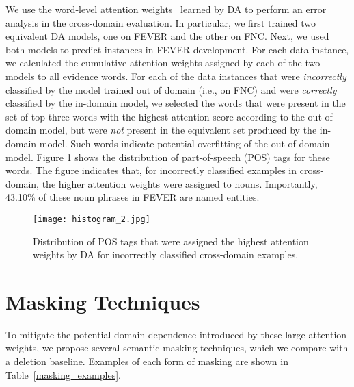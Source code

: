 \documentclass[11pt,a4paper]{article}
\begin{document}
We use the word-level attention weights~\cite{bahdanau2014neural} learned by DA to perform  an error analysis in the cross-domain evaluation. 
In particular, we first trained two equivalent DA models, one on FEVER and the other on FNC. 
Next, we used both models to predict instances in FEVER development. For each data instance, we calculated the cumulative attention weights assigned by each of the two models to all evidence words. 
For each of the data instances that were {\em incorrectly} classified by the model trained out of domain (i.e., on FNC) and were {\em correctly} classified by the in-domain model, 
we  selected the words that were present in the set of top three words with the highest attention score according to the out-of-domain model, but were {\em not} present in the equivalent set produced by the in-domain model. Such words indicate potential overfitting of the out-of-domain model. 
Figure \ref{fig:attention} shows the distribution of part-of-speech (POS) tags for these words. The figure indicates that, for incorrectly classified examples in cross-domain, the higher attention weights were assigned to nouns.
Importantly, 43.10\% of these noun phrases in FEVER are named entities. 



\begin{figure}
 \texttt{[image: histogram\_2.jpg]}
    \vspace{-3mm}
    \caption{ Distribution of POS tags that were assigned the highest attention weights by DA for incorrectly classified cross-domain examples.}
  \label{fig:attention}
\vspace{-6mm}
\end{figure}



\section{Masking Techniques}\label{masking_techniques}

To mitigate the potential domain dependence introduced by these large attention weights, we propose several semantic masking techniques, which we compare with a deletion baseline.  Examples of each form of masking are shown in Table~\ref{masking_examples}.
\end{document}
